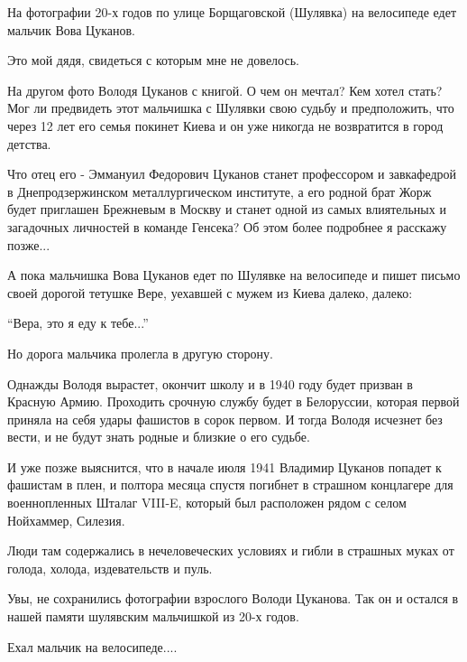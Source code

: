 \raggedcolumns
\begin{multicols}{3} %
\setlength{\parindent}{0pt}


На фотографии 20-х годов по улице Борщаговской (Шулявка) на велосипеде едет
мальчик Вова Цуканов. 

Это мой дядя, свидеться с которым мне не довелось.

На другом фото Володя Цуканов с книгой. О чем он мечтал? Кем хотел стать? Мог
ли предвидеть этот мальчишка с Шулявки свою судьбу и предположить, что через 12
лет его семья покинет Киева и он уже никогда не возвратится в город детства.


Что отец его - Эммануил Федорович Цуканов станет профессором и завкафедрой в
Днепродзержинском металлургическом институте, а его родной брат Жорж будет
приглашен Брежневым в Москву и станет одной из самых влиятельных и загадочных
личностей в команде Генсека? Об этом более подробнее я расскажу позже...


А пока мальчишка Вова Цуканов едет по Шулявке на велосипеде и пишет письмо
своей дорогой тетушке Вере, уехавшей с мужем из Киева далеко, далеко:

\enquote{Вера, это я еду к тебе...}

Но дорога мальчика пролегла в другую сторону.

Однажды Володя вырастет, окончит школу и в 1940 году будет призван в Красную
Армию. Проходить срочную службу будет в Белоруссии, которая первой приняла на
себя удары фашистов в сорок первом. И тогда Володя исчезнет без вести, и не
будут знать родные и близкие о его судьбе.


И уже позже выяснится, что в начале июля 1941 Владимир Цуканов попадет к
фашистам в плен, и полтора месяца спустя погибнет в страшном концлагере для
военнопленных Шталаг VIII-E, который был расположен рядом с селом Нойхаммер,
Силезия. 

Люди там содержались в нечеловеческих условиях и гибли в страшных муках от
голода, холода, издевательств и пуль.

Увы, не сохранились фотографии взрослого Володи Цуканова. Так он и остался в
нашей памяти шулявским мальчишкой из 20-х годов.

Ехал мальчик на велосипеде....

\end{multicols} %

